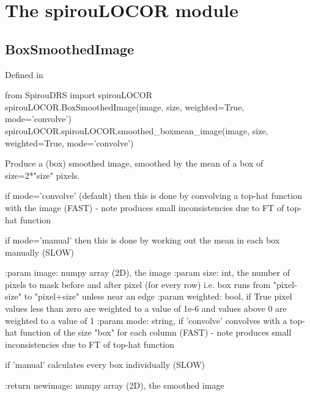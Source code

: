 
\clearpage
\newpage
\noindent\begin{minipage}{\textwidth}
\section{The spirouLOCOR module}
\label{ch:the_module:spirouLOCOR}

\subsection{BoxSmoothedImage}

Defined in \spirouLOCOR{}

\begin{pythonbox}
from SpirouDRS import spirouLOCOR
spirouLOCOR.BoxSmoothedImage(image, size, weighted=True, mode='convolve')
spirouLOCOR.spirouLOCOR.smoothed_boxmean_image(image, size, weighted=True, mode='convolve')
\end{pythonbox}

\begin{pythondocstring}
Produce a (box) smoothed image, smoothed by the mean of a box of
    size=2*"size" pixels.

    if mode='convolve' (default) then this is done
    by convolving a top-hat function with the image (FAST)
    - note produces small inconsistencies due to FT of top-hat function

    if mode='manual' then this is done by working out the mean in each
    box manually (SLOW)

:param image: numpy array (2D), the image
:param size: int, the number of pixels to mask before and after pixel
             (for every row)
             i.e. box runs from  "pixel-size" to "pixel+size" unless
             near an edge
:param weighted: bool, if True pixel values less than zero are weighted to
                 a value of 1e-6 and values above 0 are weighted to a value
                 of 1
:param mode: string, if 'convolve' convolves with a top-hat function of the
                     size "box" for each column (FAST) - note produces small
                     inconsistencies due to FT of top-hat function

                     if 'manual' calculates every box individually (SLOW)

:return newimage: numpy array (2D), the smoothed image
\end{pythondocstring}
\end{minipage}


